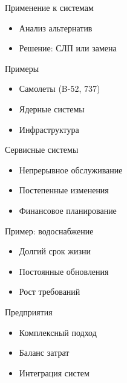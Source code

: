 \documentclass{beamer}
\begin{document}

\begin{frame}{Применение к системам}
\begin{itemize}
    \item Анализ альтернатив
    \item Решение: СЛП или замена
\end{itemize}

\end{frame}


\begin{frame}{Примеры}
\begin{itemize}
    \item Самолеты (B-52, 737)
    \item Ядерные системы
    \item Инфраструктура
\end{itemize}

\end{frame}


\begin{frame}{Сервисные системы}
\begin{itemize}
    \item Непрерывное обслуживание
    \item Постепенные изменения
    \item Финансовое планирование
\end{itemize}

\end{frame}


\begin{frame}{Пример: водоснабжение}
\begin{itemize}
    \item Долгий срок жизни
    \item Постоянные обновления
    \item Рост требований
\end{itemize}

\end{frame}


\begin{frame}{Предприятия}
\begin{itemize}
    \item Комплексный подход
    \item Баланс затрат
    \item Интеграция систем
\end{itemize}

\end{frame}
\end{document}
